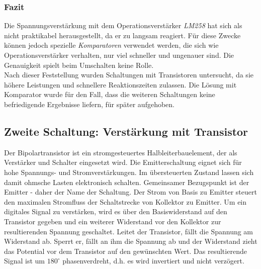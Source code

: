 \subsubsection{Fazit}
Die Spannungsverstärkung mit dem Operationsverstärker \textit{LM258} hat sich als nicht praktikabel herausgestellt, da er zu langsam reagiert. Für diese Zwecke können jedoch spezielle \textit{Komparatoren} verwendet werden, die sich wie Operationsverstärker verhalten, nur viel schneller und ungenauer sind. Die Genauigkeit spielt beim Umschalten keine Rolle.\\
Nach dieser Feststellung wurden Schaltungen mit Transistoren untersucht, da sie höhere Leistungen und schnellere Reaktionszeiten zulassen. Die Lösung mit Komparator wurde für den Fall, dass die weiteren Schaltungen keine befriedigende Ergebnisse liefern, für später aufgehoben.


\subsection{Zweite Schaltung: Verstärkung mit Transistor}
Der Bipolartransistor ist ein stromgesteuertes Halbleiterbauelement, der als Verstärker und Schalter eingesetzt wird. Die Emitterschaltung eignet sich für hohe Spannungs- und Stromverstärkungen. Im übersteuerten Zustand lassen sich damit ohmsche Lasten elektronisch schalten. Gemeinsamer Bezugspunkt ist der Emitter - daher der Name der Schaltung. Der Strom von Basis zu Emitter steuert den maximalen Stromfluss der Schaltstrecke von Kollektor zu Emitter. Um ein digitales Signal zu verstärken, wird es über den Basiswiderstand auf den Transistor gegeben und ein weiterer Widerstand vor den Kollektor zur resultierenden Spannung geschaltet. Leitet der Transistor, fällt die Spannung am Widerstand ab. Sperrt er, fällt an ihm die Spannung ab und  der Widerstand zieht das Potential vor dem Transistor auf den gewünschten Wert. Das resultierende Signal ist um $180^\circ$ phasenverdreht, d.h. es wird invertiert und nicht verzögert.\\


